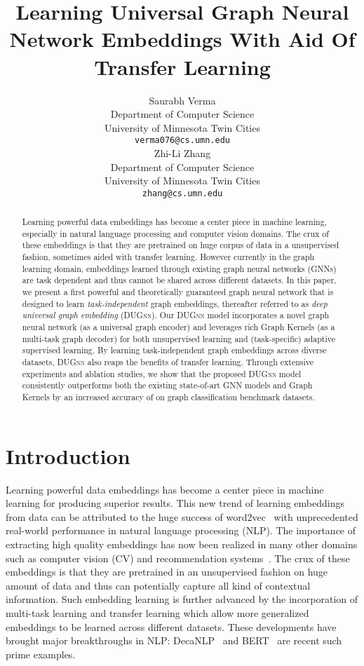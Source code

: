 \documentclass{article}
\title{Learning Universal Graph Neural Network Embeddings With Aid Of Transfer Learning}
\author{Saurabh Verma \\
  Department of Computer Science\\
  University of Minnesota Twin Cities\\
  \texttt{verma076@cs.umn.edu} \\
\And
   Zhi-Li Zhang \\
  Department of Computer Science\\
University of Minnesota Twin Cities\\
\texttt{zhang@cs.umn.edu} \\
}
\begin{document}
\maketitle

\begin{abstract}

Learning powerful data embeddings has become a center piece in machine learning,  especially in natural language processing  and computer vision  domains. The crux of these embeddings is that they are pretrained  on huge corpus of data in a unsupervised fashion, sometimes aided with transfer learning. However currently in the graph learning domain, embeddings learned through existing graph  neural networks (GNNs) are  task dependent and  thus cannot be shared across different datasets. In this paper, we present a  first powerful and theoretically guaranteed graph neural network that is designed to learn {\em task-independent} graph embeddings,  thereafter referred to as {\em deep  universal graph embedding} (\textsc{DUGnn}). Our \textsc{DUGnn}  model 
incorporates a novel graph neural network (as a universal graph encoder) and leverages rich Graph Kernels (as a multi-task graph decoder) for both unsupervised learning and (task-specific) adaptive supervised learning. 
By learning task-independent graph embeddings across diverse datasets, \textsc{DUGnn} also reaps the benefits of transfer learning. 
Through extensive experiments and ablation studies, we show that the proposed \textsc{DUGnn}  model consistently outperforms both the existing state-of-art GNN models and Graph Kernels by an increased accuracy of  on graph classification benchmark datasets.

\end{abstract}




\section{Introduction}

Learning powerful data embeddings   has become a center piece in machine learning for producing superior results. This new trend of learning embeddings from data can be attributed to the  huge success  of word2vec~\cite{mikolov2013distributed, pennington2014glove}  with unprecedented  real-world performance in natural language processing (NLP). The importance of  extracting high quality  embeddings has now been  realized   in many other domains such as computer vision (CV)  and recommendation systems~\cite{kiela2014learning, karpathy2014deep, zhang2016collaborative}. The crux of these embeddings is that they are  pretrained  in an unsupervised fashion on huge amount of data  and thus can potentially capture all kind of contextual information. Such embedding learning is further advanced by the incorporation of multi-task learning and transfer learning which allow more generalized embeddings to be learned across different datasets. These developments have brought major breakthroughs in NLP: DecaNLP~\cite{mccann2018natural} and BERT~\cite{devlin2018bert} are  recent such prime examples. 
\end{document}
